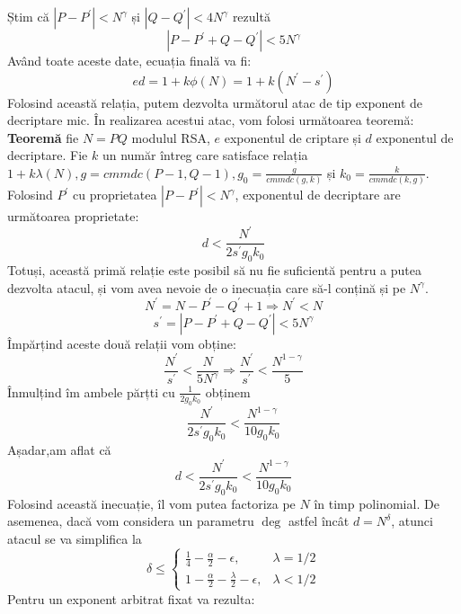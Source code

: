 \documentclass[12pt, oneside]{book}
\begin{document}
Știm că $ \left|P-P^{'}\right| < N^{\gamma}  $ și $\left|Q-Q^{'}\right| < 4N^{\gamma}$ rezultă
$$ \left| P-P^{'} + Q -Q^{'}\right| < 5N^{\gamma} $$ 
Având toate aceste date, ecuația finală va fi:
$$ ed=1+k\phi(N) =1 + k(N^{'} -s^{'})$$
Folosind această relația, putem dezvolta următorul atac de tip exponent de decriptare mic. În realizarea acestui atac, vom folosi următoarea teoremă: \\
\textbf{Teoremă} fie $N=PQ$ modulul RSA, $e$ exponentul de criptare și $d$ exponentul de decriptare. Fie $k$ un număr întreg care satisface relația $1 + k \lambda(N),g=cmmdc(P-1,Q-1),g_0=\frac{g}{cmmdc(g,k)}$ și $k_0=\frac{k}{cmmdc(k,g)}$. Folosind $P^{'}$ cu proprietatea $|P - P^{'}|<N^{\gamma}$, exponentul de decriptare are următoarea proprietate:
$$d<\frac{N^{'}}{2s^{'}g_0k_0}$$
Totuși, această primă relație este posibil să nu fie suficientă pentru a putea dezvolta atacul, și vom avea nevoie de o inecuația care să-l conțină și pe $N^{\gamma}$.
$$ N^{'} = N - P^{'} - Q^{'} + 1 \Rightarrow N^{'}  < N$$
$$ s^{'} = \left|P-P^{'} + Q - Q^{'}\right| < 5N^{\gamma}$$
Împărțind aceste două relații vom obține:
$$\frac{N^{'}}{s^{'}} < \frac{N}{5N^{\gamma}} \Rightarrow \frac{N^{'}}{s^{'}} < \frac{N^{1-\gamma}}{5} $$
Înmulțind îm ambele părțti cu $\frac{1}{2g_0k_0}$ obținem
$$ \frac{N^{'}}{2s^{'}g_0k_0} < \frac{N^{1-\gamma}}{10g_0k_0}$$
Așadar,am aflat că 
$$ d<\frac{N^{'}}{2s^{'}g_0k_0}<\frac{N^{1-\gamma}}{10g_0k_0}$$
Folosind această inecuație, îl vom putea factoriza pe $N$ în timp polinomial.
De asemenea, dacă vom considera un parametru $\deg$ astfel încât $d=N^{\delta}$, atunci atacul se va simplifica la 
\[
\delta \leq
\begin{cases}
\frac{1}{4} - \frac{\alpha}{2} - \epsilon,  &\lambda=1/2  \\
1 - \frac{\alpha}{2} - \frac{\lambda}{2} - \epsilon,  &\lambda<1/2
\end{cases}
\]
Pentru un exponent arbitrat fixat va rezulta:
\end{document}
